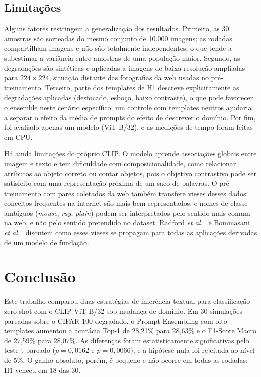 \documentclass[conference]{IEEEtran}
\begin{document}
\subsection{Limitações}
\balance

Alguns fatores restringem a generalização dos resultados. Primeiro, as 30 amostras são sorteadas do mesmo conjunto de 10.000 imagens; as rodadas compartilham imagens e não são totalmente independentes, o que tende a subestimar a variância entre amostras de uma população maior. Segundo, as degradações são sintéticas e aplicadas a imagens de baixa resolução ampliadas para $224 \times 224$, situação distante das fotografias da web usadas no pré-treinamento. Terceiro, parte dos templates de H1 descreve explicitamente as degradações aplicadas (desfocado, esboço, baixo contraste), o que pode favorecer o ensemble neste cenário específico; um controle com templates neutros ajudaria a separar o efeito da média de prompts do efeito de descrever o domínio. Por fim, foi avaliado apenas um modelo (ViT-B/32), e as medições de tempo foram feitas em CPU.

Há ainda limitações do próprio CLIP. O modelo aprende associações globais entre imagem e texto e tem dificuldade com composicionalidade, como relacionar atributos ao objeto correto ou contar objetos, pois o objetivo contrastivo pode ser satisfeito com uma representação próxima de um saco de palavras. O pré-treinamento com pares coletados da web também transfere vieses desses dados: conceitos frequentes na internet são mais bem representados, e nomes de classe ambíguos (\textit{mouse}, \textit{ray}, \textit{plain}) podem ser interpretados pelo sentido mais comum na web, e não pelo sentido pretendido no dataset. Radford \textit{et al.}~\cite{radford2021} e Bommasani \textit{et al.}~\cite{bommasani2021} discutem como esses vieses se propagam para todas as aplicações derivadas de um modelo de fundação.

\section{Conclusão}

Este trabalho comparou duas estratégias de inferência textual para classificação zero-shot com o CLIP ViT-B/32 sob mudança de domínio. Em 30 simulações pareadas sobre o CIFAR-100 degradado, o Prompt Ensembling com oito templates aumentou a acurácia Top-1 de 28,21\% para 28,63\% e o F1-Score Macro de 27,59\% para 28,07\%. As diferenças foram estatisticamente significativas pelo teste t pareado ($p = 0{,}0162$ e $p = 0{,}0066$), e a hipótese nula foi rejeitada ao nível de 5\%. O ganho absoluto, porém, é pequeno e não ocorre em todas as rodadas: H1 venceu em 18 das 30.
\end{document}
